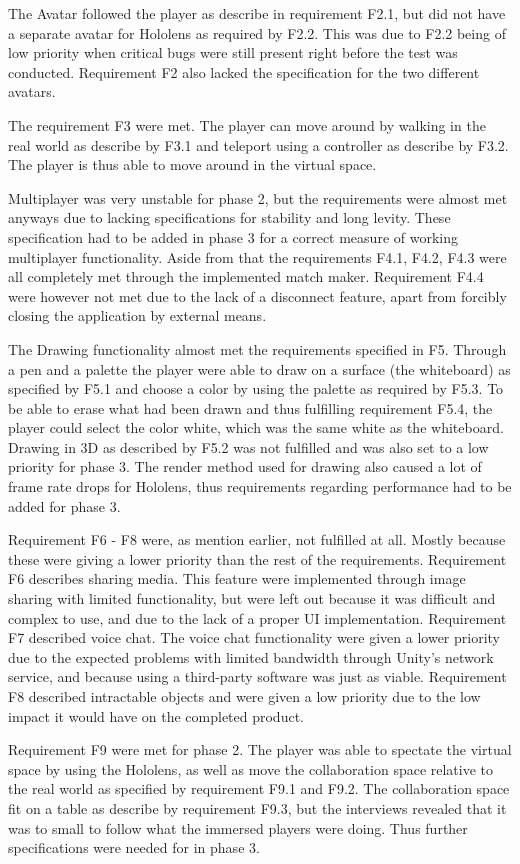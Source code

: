         The Avatar followed the player as describe in requirement F2.1, but did not have a separate avatar for Hololens as required by F2.2. This was due to F2.2 being of low priority when critical bugs were still present right before the test was conducted. Requirement F2 also lacked the specification for the two different avatars.
        
        The requirement F3 were met. The player can move around by walking in the real world as describe by F3.1 and teleport using a controller as describe by F3.2. The player is thus able to move around in the virtual space.
        
        Multiplayer was very unstable for phase 2, but the requirements were almost met anyways due to lacking specifications for stability and long levity. These specification had to be added in phase 3 for a correct measure of working multiplayer functionality. Aside from that the requirements F4.1, F4.2, F4.3 were all completely met through the implemented match maker. Requirement F4.4 were however not met due to the lack of a disconnect feature, apart from forcibly closing the application by external means.
        
        The Drawing functionality almost met the requirements specified in F5. Through a pen and a palette the player were able to draw on a surface (the whiteboard) as specified by F5.1 and choose a color by using the palette as required by F5.3. To be able to erase what had been drawn and thus fulfilling requirement F5.4, the player could select the color white, which was the same white as the whiteboard. Drawing in 3D as described by F5.2 was not fulfilled and was also set to a low priority for phase 3. The render method used for drawing also caused a lot of frame rate drops for Hololens, thus requirements regarding performance had to be added for phase 3.
        
        Requirement F6 - F8 were, as mention earlier, not fulfilled at all. Mostly because these were giving a lower priority than the rest of the requirements. Requirement F6 describes sharing media. This feature were implemented through image sharing with limited functionality, but were left out because it was difficult and complex to use, and due to the lack of a proper UI implementation. Requirement F7 described voice chat. The voice chat functionality were given a lower priority due to the expected problems with limited bandwidth through Unity's network service, and because using a third-party software was just as viable. Requirement F8 described intractable objects and were given a low priority due to the low impact it would have on the completed product.
        
        Requirement F9 were met for phase 2. The player was able to spectate the virtual space by using the Hololens, as well as move the collaboration space relative to the real world as specified by requirement F9.1 and F9.2. The collaboration space fit on a table as describe by requirement F9.3, but the interviews revealed that it was to small to follow what the immersed players were doing. Thus further specifications were needed for in phase 3.
        